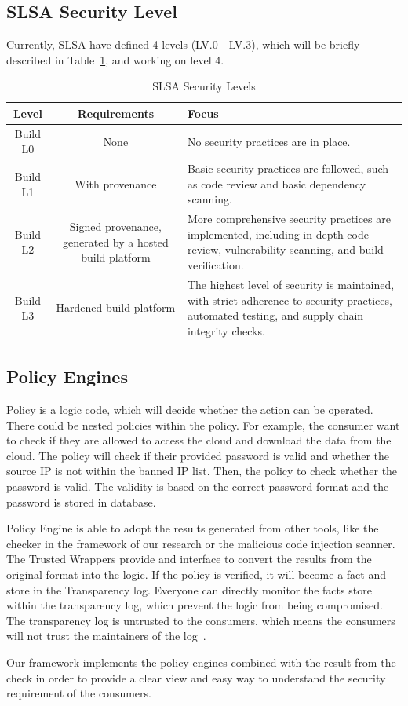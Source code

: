 \subsection{SLSA Security Level}
Currently, SLSA have defined 4 levels (LV.0 - LV.3), which will be 
briefly described in Table~\ref{tab:slsa-levels}, and working on level 4.
\begin{table}[ht]
  \centering
  \caption{SLSA Security Levels}
  \label{tab:slsa-levels}
  \begin{tabular}{|c|c|p{6cm}|}
  \hline
  \textbf{Level} & \textbf{Requirements} & \textbf{Focus} \\
  \hline
  Build L0 & None & No security practices are in place. \\
  \hline
  Build L1 & With provenance & Basic security practices are followed, such as code review and basic dependency scanning. \\
  \hline
  Build L2 & Signed provenance, generated by a hosted build platform & More comprehensive security practices are implemented, including in-depth code review, vulnerability scanning, and build verification. \\
  \hline
  Build L3 & Hardened build platform & The highest level of security is maintained, with strict adherence to security practices, automated testing, and supply chain integrity checks. \\
  \hline
  \end{tabular}
\end{table}

\subsection{Policy Engines}
Policy is a logic code, which will decide whether the action can be operated. There could be
nested policies within the policy. For example, the consumer want to check if they are allowed
to access the cloud and download the data from the cloud. The policy will check if their provided password
is valid and whether the source IP is not within the banned IP list. Then, the policy to check whether
the password is valid. The validity is based on the correct password format and the password is stored in database.

Policy Engine is able to adopt the results generated from other tools, like the checker in the framework of 
our research or the malicious code injection scanner. The Trusted Wrappers provide and interface to 
convert the results from the original format into the logic. If the policy is verified, it will become 
a fact and store in the Transparency log. Everyone can directly monitor the facts store within the transparency 
log, which prevent the logic from being compromised. The transparency log is untrusted to the consumers,
which means the consumers will not trust the maintainers of the log~\cite{ferraiuolo2022policy}.

Our framework implements the policy engines combined with the result from the check in order to provide a clear 
view and easy way to understand the security requirement of the consumers.


